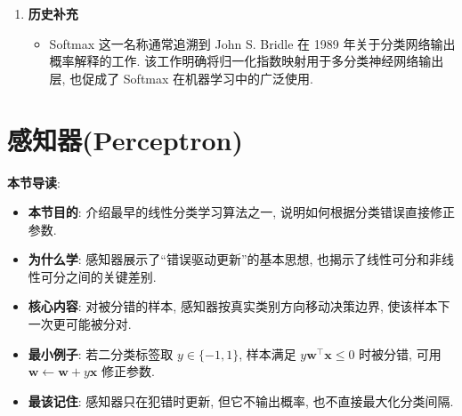 \documentclass{../nndlcourse}
\begin{document}
\begin{enumerate}
\begin{itemize}
        \item 若把类别得分看成负能量, 或把温度参数吸收到得分缩放中, 就得到与 Softmax 相同的形式. 这说明 Softmax 也可以理解为一种“得分越高, 概率越大”的能量模型分布.
    \end{itemize}
    \item \textbf{历史补充}
    \begin{itemize}
        \item Softmax 这一名称通常追溯到 John S. Bridle 在 1989 年关于分类网络输出概率解释的工作\citep{bridle1990probabilistic}. 该工作明确将归一化指数映射用于多分类神经网络输出层, 也促成了 Softmax 在机器学习中的广泛使用.
    \end{itemize}
\end{enumerate}

\section{感知器(Perceptron)}
\textbf{本节导读}:
\begin{itemize}
    \item \textbf{本节目的}: 介绍最早的线性分类学习算法之一, 说明如何根据分类错误直接修正参数.
    \item \textbf{为什么学}: 感知器展示了“错误驱动更新”的基本思想, 也揭示了线性可分和非线性可分之间的关键差别.
    \item \textbf{核心内容}: 对被分错的样本, 感知器按真实类别方向移动决策边界, 使该样本下一次更可能被分对.
    \item \textbf{最小例子}: 若二分类标签取 $y\in\{-1,1\}$, 样本满足 $y\boldsymbol{w}^{\top}\boldsymbol{x}\le 0$ 时被分错, 可用 $\boldsymbol{w}\leftarrow\boldsymbol{w}+y\boldsymbol{x}$ 修正参数.
    \item \textbf{最该记住}: 感知器只在犯错时更新, 但它不输出概率, 也不直接最大化分类间隔.
\end{itemize}
\end{document}
